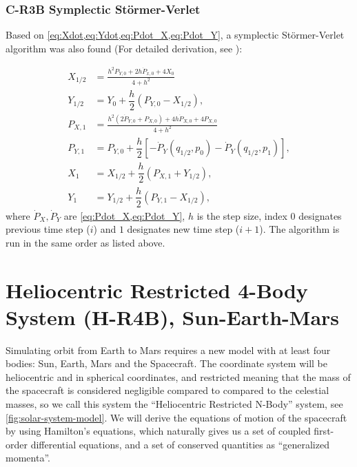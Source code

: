 \subsubsection{C-R3B Symplectic Störmer-Verlet}
Based on \cref{eq:Xdot,eq:Ydot,eq:Pdot_X,eq:Pdot_Y}, a symplectic Störmer-Verlet algorithm was also found (For detailed derivation, see \cite{Saxe2015}):

\begin{align}
    X_{1/2} &= \frac{h^2 P_{Y,0} + 2 h \dot{P}_{x,0} + 4 X_0}{4 + h^2} \label{eq:verlet-x_1/2} \\
    Y_{1/2} &= Y_0 + \dfrac{h}{2} (P_{Y,0} - X_{1/2}), \label{eq:verlet-y_1/2} \\
    P_{X,1} &= \frac{h^2 (2 \dot{P}_{Y,0} + P_{X,0}) + 4 h \dot{P}_{X,0} + 4 P_{X,0} }{4 + h^2} \label{eq:verlet-px_1} \\
    P_{Y,1} &= P_{Y,0} + \dfrac{h}{2} \left[-\dot{P}_Y(q_{1/2},p_0) -\dot{P}_Y(q_{1/2},p_1) \right], \label{eq:verlet-py_1} \\
    X_1 &= X_{1/2} + \dfrac{h}{2} (P_{X,1} + Y_{1/2}), \label{eq:verlet-x_1} \\
    Y_1 &= Y_{1/2} + \dfrac{h}{2} (P_{Y,1} - X_{1/2}), \label{eq:verlet-y_1}
\end{align}
where \(\dot{P}_X,\dot{P}_Y\) are \cref{eq:Pdot_X,eq:Pdot_Y}, \(h\) is the step size, index \(0\) designates previous time step ($i$) and \(1\) designates new time step ($i+1$). The algorithm is run in the same order as listed above.

\section{Heliocentric Restricted 4-Body System (H-R4B), Sun-Earth-Mars}
Simulating orbit from Earth to Mars requires a new model with at least four bodies: Sun, Earth, Mars and the Spacecraft. The coordinate system will be heliocentric and in spherical coordinates, and restricted meaning that the mass of the spacecraft is considered negligible compared to compared to the celestial masses, so we call this system the ``Heliocentric Restricted N-Body'' system, see \cref{fig:solar-system-model}. We will derive the equations of motion of the spacecraft by using Hamilton's equations, which naturally gives us a set of coupled first-order differential equations, and a set of conserved quantities as ``generalized momenta''.

